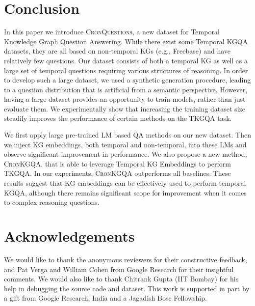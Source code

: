 \documentclass[11pt,a4paper]{article}
\newcommand{\method}{\textsc{CronKGQA}}
\newcommand{\dataset}{\textsc{CronQuestions}}
\begin{document}
\section{Conclusion}

In this paper we introduce \dataset{}, a new dataset for Temporal Knowledge Graph Question Answering. While there exist some Temporal KGQA datasets, they are all based on non-temporal KGs (e.g., Freebase) and have relatively few questions. Our dataset consists of both a temporal KG as well as a large set of temporal questions requiring various structures of reasoning.  In order to develop such a large dataset, we used a  synthetic generation procedure, leading to a question distribution that is artificial from a semantic perspective. However, having a large dataset provides an opportunity to train models, rather than just evaluate them.  We experimentally show that increasing the training dataset size steadily improves the performance of certain methods on the TKGQA task. 

We first apply large pre-trained LM based QA methods on our new dataset. Then we inject KG embeddings, both temporal and non-temporal, into these LMs and observe significant improvement in performance. We also propose a new method, \method{}, that is able to leverage Temporal KG Embeddings to perform TKGQA. In our experiments, \method{} outperforms all baselines. These results suggest that KG embeddings can be effectively used to perform temporal KGQA, although there remains significant scope for improvement when it comes to complex reasoning questions.

\section*{Acknowledgements}

We would like to thank the anonymous reviewers for their constructive feedback, and Pat Verga and William Cohen from Google Research for their insightful comments. We would also like to thank Chitrank Gupta (IIT Bombay) for his help in debugging the source code and dataset. This work is supported in part by a gift from Google Research, India and a Jagadish Bose Fellowship. 















\end{document}
